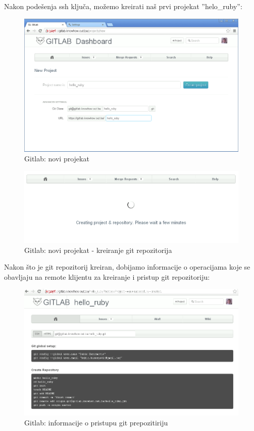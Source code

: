 \documentclass[times, utf8, seminar]{fit}
\begin{document}
Nakon podešenja ssh ključa, možemo kreirati naš prvi projekat ''helo\_ruby'':

\begin{figure}[H]
\centering
\includegraphics[width=15cm]{img/gitlab_new_project.png}
\caption{Gitlab: novi projekat}
\end{figure}

\begin{figure}[H]
\centering
\includegraphics[width=15cm]{img/gitlab_new_project_2.png}
\caption{Gitlab: novi projekat - kreiranje git repozitorija}
\end{figure}

Nakon što je git repozitorij kreiran, dobijamo informacije o operacijama koje se obavljaju na remote klijentu za kreiranje i pristup git repozitoriju:

\begin{figure}[H]
\centering
\includegraphics[width=15cm]{img/gitlab_new_project_3.png}
\caption{Gitlab: informacije o pristupu git prepozitiriju}
\end{figure}
\end{document}
